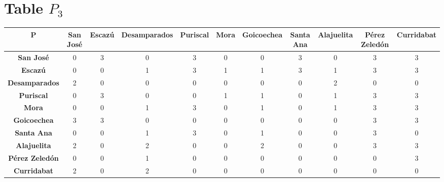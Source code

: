 \documentclass{article}
\begin{document}
\section{Table $P_{3}$}
\begin{center}
    \begin{tabular}{|c||c|c|c|c|c|c|c|c|c|c|}
        \hline
        \textbf{P} & \textbf{San José} & \textbf{Escazú} & \textbf{Desamparados} & \textbf{Puriscal} & \textbf{Mora} & \textbf{Goicoechea} & \textbf{Santa Ana} & \textbf{Alajuelita} & \textbf{Pérez Zeledón} & \textbf{Curridabat} \\
        \hline
        \hline
        \textbf{San José}& 0 & \cellcolor[HTML]{D74894}$3$ & 0 & \cellcolor[HTML]{D74894}$3$ & 0 & 0 & \cellcolor[HTML]{D74894}$3$ & 0 & \cellcolor[HTML]{D74894}$3$ & \cellcolor[HTML]{D74894}$3$ \\
        \hline
        \textbf{Escazú}& 0 & 0 & 1 & \cellcolor[HTML]{D74894}$3$ & 1 & 1 & \cellcolor[HTML]{D74894}$3$ & 1 & \cellcolor[HTML]{D74894}$3$ & \cellcolor[HTML]{D74894}$3$ \\
        \hline
        \textbf{Desamparados}& 2 & 0 & 0 & 0 & 0 & 0 & 0 & 2 & 0 & 0 \\
        \hline
        \textbf{Puriscal}& 0 & \cellcolor[HTML]{D74894}$3$ & 0 & 0 & 1 & 1 & 0 & 1 & \cellcolor[HTML]{D74894}$3$ & \cellcolor[HTML]{D74894}$3$ \\
        \hline
        \textbf{Mora}& 0 & 0 & 1 & \cellcolor[HTML]{D74894}$3$ & 0 & 1 & 0 & 1 & \cellcolor[HTML]{D74894}$3$ & \cellcolor[HTML]{D74894}$3$ \\
        \hline
        \textbf{Goicoechea}& \cellcolor[HTML]{D74894}$3$ & \cellcolor[HTML]{D74894}$3$ & 0 & 0 & 0 & 0 & 0 & 0 & \cellcolor[HTML]{D74894}$3$ & \cellcolor[HTML]{D74894}$3$ \\
        \hline
        \textbf{Santa Ana}& 0 & 0 & 1 & \cellcolor[HTML]{D74894}$3$ & 0 & 1 & 0 & 0 & \cellcolor[HTML]{D74894}$3$ & 0 \\
        \hline
        \textbf{Alajuelita}& 2 & 0 & 2 & 0 & 0 & 2 & 0 & 0 & \cellcolor[HTML]{D74894}$3$ & \cellcolor[HTML]{D74894}$3$ \\
        \hline
        \textbf{Pérez Zeledón}& 0 & 0 & 1 & 0 & 0 & 0 & 0 & 0 & 0 & \cellcolor[HTML]{D74894}$3$ \\
        \hline
        \textbf{Curridabat}& 2 & 0 & 2 & 0 & 0 & 0 & 0 & 0 & 0 & 0 \\
        \hline
    \end{tabular}
\end{center}
\end{document}

